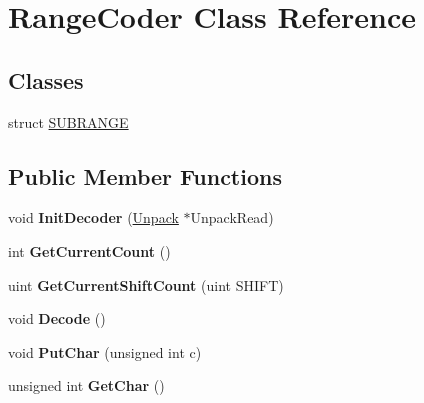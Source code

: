 \hypertarget{class_range_coder}{\section{Range\-Coder Class Reference}
\label{class_range_coder}
}
\subsection*{Classes}
\begin{DoxyCompactItemize}
\item 
struct \hyperlink{struct_range_coder_1_1_s_u_b_r_a_n_g_e}{S\-U\-B\-R\-A\-N\-G\-E}
\end{DoxyCompactItemize}
\subsection*{Public Member Functions}
\begin{DoxyCompactItemize}
\item 
\hypertarget{class_range_coder_acd9c3a3dbe80ffe3c7613a8a6a4387aa}{void {\bfseries Init\-Decoder} (\hyperlink{class_unpack}{Unpack} $\ast$Unpack\-Read)}\label{class_range_coder_acd9c3a3dbe80ffe3c7613a8a6a4387aa}

\item 
\hypertarget{class_range_coder_a134cd616672190977b018c4458f41122}{int {\bfseries Get\-Current\-Count} ()}\label{class_range_coder_a134cd616672190977b018c4458f41122}

\item 
\hypertarget{class_range_coder_aa9974b9aaf835e26b4527bc42085e6b5}{uint {\bfseries Get\-Current\-Shift\-Count} (uint S\-H\-I\-F\-T)}\label{class_range_coder_aa9974b9aaf835e26b4527bc42085e6b5}

\item 
\hypertarget{class_range_coder_a909c39b5c0c2c2409660f3b5446f1d3c}{void {\bfseries Decode} ()}\label{class_range_coder_a909c39b5c0c2c2409660f3b5446f1d3c}

\item 
\hypertarget{class_range_coder_a332571b493b532f5f3b91abee33c5e5e}{void {\bfseries Put\-Char} (unsigned int c)}\label{class_range_coder_a332571b493b532f5f3b91abee33c5e5e}

\item 
\hypertarget{class_range_coder_acece02235f01a0c3fa557e3ac340b3bc}{unsigned int {\bfseries Get\-Char} ()}\label{class_range_coder_acece02235f01a0c3fa557e3ac340b3bc}

\end{DoxyCompactItemize}
